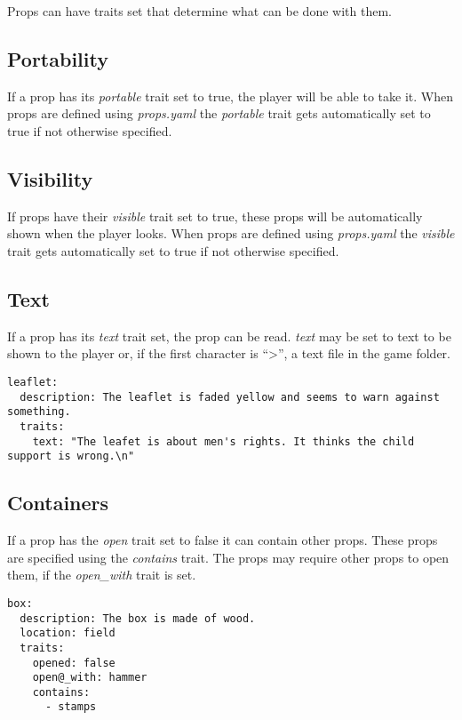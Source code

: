 \documentclass[letterpaper,10pt,english]{sphinxmanual}
\begin{document}
Props can have traits set that determine what can be done with them.


\subsection{Portability}
\label{elements:portability}
If a prop has its \emph{portable} trait set to true, the player will be able to take it. When props are defined using \emph{props.yaml} the \emph{portable} trait gets automatically set to true if not otherwise specified.


\subsection{Visibility}
\label{elements:visibility}
If props have their \emph{visible} trait set to true, these props will be automatically shown when the player looks. When props are defined using \emph{props.yaml} the \emph{visible} trait gets automatically set to true if not otherwise specified.


\subsection{Text}
\label{elements:text}
If a prop has its \emph{text} trait set, the prop can be read. \emph{text} may be set to text to be shown to the player or, if the first character is ``\textgreater{}'', a text file in the game folder.

\begin{Verbatim}[commandchars=@\[\]]
leaflet:
  description: The leaflet is faded yellow and seems to warn against something.
  traits:
    text: "The leafet is about men's rights. It thinks the child support is wrong.\n"
\end{Verbatim}


\subsection{Containers}
\label{elements:containers}
If a prop has the \emph{open} trait set to false it can contain other props. These props are specified using the \emph{contains} trait. The props may require other props to open them, if the \emph{open\_with} trait is set.

\begin{Verbatim}[commandchars=@\[\]]
box:
  description: The box is made of wood.
  location: field
  traits:
    opened: false
    open@_with: hammer
    contains:
      - stamps
\end{Verbatim}
\end{document}
